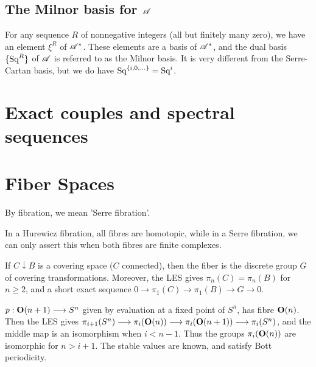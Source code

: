 \documentclass[11pt]{article}
\begin{document}
{\subsection{The Milnor basis for \texorpdfstring{$\mathscr{A}$}{A}}
For any sequence $R$ of nonnegative integers (all but finitely many zero), we have an element $\xi^R$ of $\mathscr{A}^*$. These elements are a basis of $\mathscr{A}^*$, and the dual basis $\{\textup{Sq}^R\}$ of $\mathscr{A}$ is referred to as the Milnor basis. It is very different from the Serre-Cartan basis, but we do have $\textup{Sq}^{\{i,0,\ldots\}}=\textup{Sq}^i$.

\section{Exact couples and spectral sequences}

\section{Fiber Spaces}
\begin{itemise}
\item By fibration, we mean 'Serre fibration'.
\item In a Hurewicz fibration, all fibres are homotopic, while in a Serre fibration, we can only assert this when both fibres are finite complexes.
\item If $C\downarrow B$ is a covering space ($C$ connected), then the fiber is the discrete group $G$ of covering transformations. Moreover, the LES gives $\pi_n(C)=\pi_n(B)$ for $n\geq2$, and a short exact sequence $0\to\pi_1(C)\to\pi_1(B)\to G\to0$.
\item $p:\textup{\textbf{O}}(n+1)\longrightarrow S^n$ given by evaluation at a fixed point of $S^n$, has fibre $\textup{\textbf{O}}(n)$. Then the LES gives $\pi_{i+1}(S^n)\longrightarrow\pi_i(\textup{\textbf{O}}(n))\longrightarrow\pi_i(\textup{\textbf{O}}(n+1))\longrightarrow\pi_i(S^n)$, and the middle map is an isomorphism when $i<n-1$. Thus the groups $\pi_i(\textup{\textbf{O}}(n))$ are isomorphic for $n>i+1$. The stable values are known, and satisfy Bott periodicity.
\end{itemise}
\setcounter{subsection}{3}
}
\end{document}
